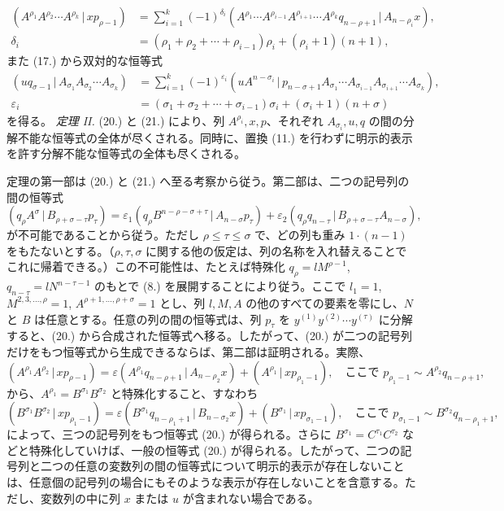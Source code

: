 \documentclass[11pt]{jlreq}
\newcommand{\pair}[2]{(#1\,|\,#2)}
\newcommand{\eps}{\varepsilon}
\begin{document}
\begin{equation}
\begin{aligned}
\pair{A^{\rho_1}A^{\rho_2}\cdots A^{\rho_k}}{xp_{\rho-1}}
&=\sum_{i=1}^{k}(-1)^{\delta_i}\pair{A^{\rho_1}\cdots A^{\rho_{i-1}}A^{\rho_{i+1}}\cdots A^{\rho_k}q_{n-\rho+1}}{A_{n-\rho_i}x},\\
\delta_i&=(\rho_1+\rho_2+\cdots+\rho_{i-1})\rho_i+(\rho_i+1)(n+1),
\end{aligned}
\tag{20}
\end{equation}
また (17.) から双対的な恒等式
\begin{equation}
\begin{aligned}
\pair{u q_{\sigma-1}}{A_{\sigma_1}A_{\sigma_2}\cdots A_{\sigma_k}}
&=\sum_{i=1}^{k}(-1)^{\eps_i}\pair{u A^{n-\sigma_i}}{p_{n-\sigma+1}A_{\sigma_1}\cdots A_{\sigma_{i-1}}A_{\sigma_{i+1}}\cdots A_{\sigma_k}},\\
\eps_i&=(\sigma_1+\sigma_2+\cdots+\sigma_{i-1})\sigma_i+(\sigma_i+1)(n+\sigma)
\end{aligned}
\tag{21}
\end{equation}
を得る。
\emph{定理 II.} (20.) と (21.) により、列 $A^{\rho_i},x,p$、それぞれ $A_{\sigma_i},u,q$ の間の分解不能な恒等式の全体が尽くされる。同時に、置換 (11.) を行わずに明示的表示を許す分解不能な恒等式の全体も尽くされる。

定理の第一部は (20.) と (21.) へ至る考察から従う。第二部は、二つの記号列の間の恒等式
\[
\pair{q_\rho A^\sigma}{B_{\rho+\sigma-\tau}p_\tau}
=\eps_1\pair{q_\rho B^{n-\rho-\sigma+\tau}}{A_{n-\sigma}p_\tau}
+\eps_2\pair{q_\rho q_{n-\tau}}{B_{\rho+\sigma-\tau}A_{n-\sigma}},
\]
が不可能であることから従う。ただし $\rho\le\tau\le\sigma$ で、どの列も重み $1\cdot(n-1)$ をもたないとする。（$\rho,\tau,\sigma$ に関する他の仮定は、列の名称を入れ替えることでこれに帰着できる。）この不可能性は、たとえば特殊化 $q_\rho=lM^{\rho-1}$, $q_{n-\tau}=lN^{n-\tau-1}$ のもとで (8.) を展開することにより従う。ここで $l_1=1$, $M^{2,3,\ldots,\rho}=1$, $A^{\rho+1,\ldots,\rho+\sigma}=1$ とし、列 $l,M,A$ の他のすべての要素を零にし、$N$ と $B$ は任意とする。任意の列の間の恒等式は、列 $p_\tau$ を $y^{(1)}y^{(2)}\cdots y^{(\tau)}$ に分解すると、(20.) から合成された恒等式へ移る。したがって、(20.) が二つの記号列だけをもつ恒等式から生成できるならば、第二部は証明される。実際、
\begin{equation}
\pair{A^{\rho_1}A^{\rho_2}}{xp_{\rho-1}}
=\eps\pair{A^{\rho_1}q_{n-\rho+1}}{A_{n-\rho_2}x}
+\pair{A^{\rho_1}}{xp_{\rho_1-1}},
\quad \text{ここで }p_{\rho_1-1}\sim A^{\rho_2}q_{n-\rho+1},
\tag{20a}
\end{equation}
から、$A^{\rho_1}=B^{\sigma_1}B^{\sigma_2}$ と特殊化すること、すなわち
\[
\pair{B^{\sigma_1}B^{\sigma_2}}{xp_{\rho_1-1}}
=\eps\pair{B^{\sigma_1}q_{n-\rho_1+1}}{B_{n-\sigma_2}x}
+\pair{B^{\sigma_1}}{xp_{\sigma_1-1}},
\quad \text{ここで } p_{\sigma_1-1}\sim B^{\sigma_2}q_{n-\rho_1+1},
\]
によって、三つの記号列をもつ恒等式 (20.) が得られる。さらに $B^{\sigma_1}=C^{\tau_1}C^{\tau_2}$ などと特殊化していけば、一般の恒等式 (20.) が得られる。したがって、二つの記号列と二つの任意の変数列の間の恒等式について明示的表示が存在しないことは、任意個の記号列の場合にもそのような表示が存在しないことを含意する。ただし、変数列の中に列 $x$ または $u$ が含まれない場合である。
\end{document}
